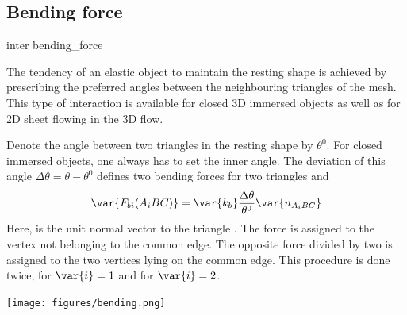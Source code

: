 



\subsection{Bending force}

\begin{essyntax}
  inter 
  bending_force
   
\end{essyntax}

The tendency of an elastic object to maintain the resting shape is achieved by 
prescribing the preferred angles between the neighbouring triangles of the mesh. 
This type of interaction is available for closed 3D immersed objects as well as 
for 2D sheet flowing in the 3D flow.


Denote the angle between two triangles in the resting shape by $\theta^0$. For 
closed immersed objects, one always has to set the inner angle. The deviation 
of this angle $\Delta \theta = \theta - \theta^0$ defines two 
bending forces for two triangles  and 
\begin{equation}
\var{F_{bi}(A_iBC)} = \var{k_b}\frac{\Delta \theta}{\theta^0} \var{n_{A_iBC}}
\end{equation}
Here,  is the unit normal vector to the triangle . The 
force  is assigned to the vertex not belonging to the common 
edge. The opposite force divided by two is assigned to the two vertices lying on 
the common edge. This procedure is done twice, for $\var{i}=1$ and for 
$\var{i}=2$.

\begin{center}
  \texttt{[image: figures/bending.png]}
\end{center}

